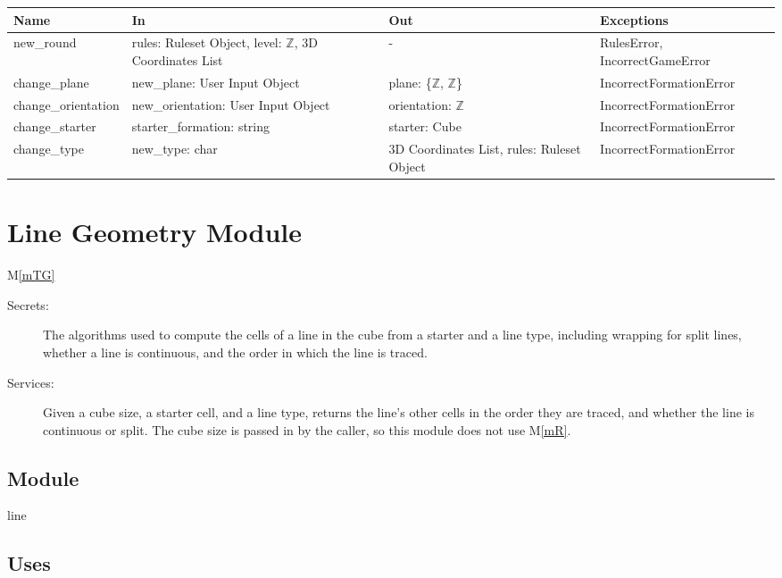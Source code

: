 \documentclass[12pt, titlepage]{article}
\newcommand{\mref}[1]{M\ref{#1}}
\begin{document}
\begin{center}
\begin{tabular}{p{4cm} p{4cm} p{4cm} p{4cm}}
\hline
\textbf{Name} & \textbf{In} & \textbf{Out} & \textbf{Exceptions} \\
\hline
new\_round & rules: Ruleset Object, level: $\mathbb{Z}$, 3D Coordinates List  & - & RulesError, IncorrectGameError \\
change\_plane & new\_plane: User Input Object & plane: \{$\mathbb{Z}$, $\mathbb{Z}$\} & IncorrectFormationError \\
change\_orientation & new\_orientation: User Input Object & orientation: $\mathbb{Z}$ & IncorrectFormationError \\
change\_starter & starter\_formation: string & starter: Cube & IncorrectFormationError \\
change\_type & new\_type: char & 3D Coordinates List, rules: Ruleset Object & IncorrectFormationError \\
\hline
\end{tabular}
\end{center}


\newpage

\section{Line Geometry Module} \mref{mTG} 


\begin{description}
\item[Secrets:] The algorithms used to compute the cells of a line in the cube from a starter and a line type, including wrapping for split lines, whether a line is continuous, and the order in which the line is traced.
\item[Services:] Given a cube size, a starter cell, and a line type, returns the line's other cells in the order they are traced, and whether the line is continuous or split. The cube size is passed in by the caller, so this module does not use \mref{mR}.
\end{description}

\subsection{Module}

line 

\subsection{Uses}
\end{document}
